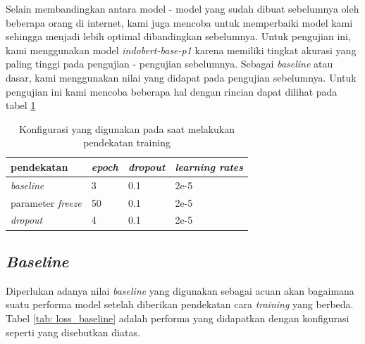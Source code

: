 Selain membandingkan antara model - model yang sudah dibuat sebelumnya oleh beberapa orang di internet, kami juga mencoba untuk memperbaiki model kami sehingga menjadi lebih optimal dibandingkan sebelumnya. Untuk pengujian ini, kami menggunakan model \textit{indobert-base-p1}  karena memiliki tingkat akurasi yang paling tinggi pada pengujian - pengujian sebelumnya. Sebagai \textit{baseline} atau dasar, kami menggunakan nilai yang didapat pada pengujian sebelumnya. Untuk pengujian ini kami mencoba beberapa hal dengan rincian dapat dilihat pada tabel \ref{tab: training_config}

\begin{table}[h]
    \centering
    \caption{Konfigurasi yang digunakan pada saat melakukan pendekatan training}
    \label{tab: training_config}
    \begin{tabular}{|l|l|l|l|}
        \hline
        \textbf{pendekatan}       & \textit{\textbf{epoch}} & \textit{\textbf{dropout}} & \textit{\textbf{learning rates}} \\ \hline
        \textit{baseline}         & 3                       & 0.1                       & 2e-5                             \\ \hline
        parameter \textit{freeze} & 50                      & 0.1                       & 2e-5                             \\ \hline
        \textit{dropout}          & 4                       & 0.1                       & 2e-5                             \\ \hline
    \end{tabular}
\end{table}

\subsection{\textit{Baseline}}

Diperlukan adanya nilai \textit{baseline} yang digunakan sebagai acuan akan bagaimana suatu performa model setelah diberikan pendekatan cara \textit{training} yang berbeda. Tabel \ref{tab: loss_baseline} adalah performa yang didapatkan dengan konfigurasi seperti yang disebutkan diatas.

